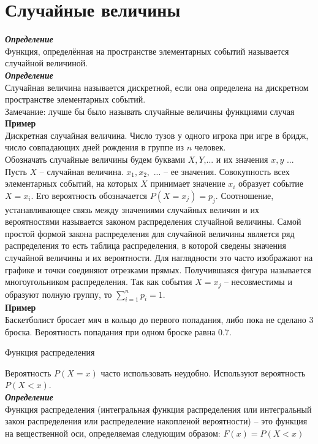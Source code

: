 \documentclass[russian, 12pt, fleqn]{article}
\begin{document}
\section{Случайные величины}
\textit{\textbf{Определение}}\\
Функция, определённая на пространстве элементарных событий называется случайной величиной.\\
\textit{\textbf{Определение}}\\
Случайная величина называется дискретной, если она определена на дискретном пространстве элементарных событий.\\
Замечание: лучше бы было называть случайные величины функциями случая\\
\textbf{Пример\ }\\Дискретная случайная величина. Число тузов у одного игрока при игре в бридж, число совпадающих дней рождения в группе из $n$ человек.\\
Обозначать случайные величины будем буквами $X, Y$,... и их значения $x, y$ ...
Пусть $X$ -- случайная величина. $x_1, x_2,$ ...  --  ее значения. Совокупность всех элементарных событий, на которых $X$ принимает значение $x_i$ образует событие $X=x_i$.
Его вероятность обозначается $P(X=x_j) = p_j$. Соотношение, устанавливающее связь между значениями случайных величин и их вероятностями называется законом распределения случайной величины. Самой простой формой закона распределения для случайной величины является ряд распределения то есть таблица распределения, в которой сведены значения случайной величины и их вероятности. Для наглядности это часто изображают на графике и точки соединяют отрезками прямых. Получившаяся фигура называется многоугольником распределения. Так как события $X=x_j$ -- несовместимы и образуют полную группу, то $\sum\limits_{i = 1}^{n}p_i = 1$.\\
\textbf{Пример\ }\\
Баскетболист бросает мяч в кольцо до первого попадания, либо пока не сделано 3 броска. Вероятность попадания при одном броске равна $0.7$.\\
\begin{center}
$\textbf{Функция распределения }$\\
\end{center}
Вероятность $P(X=x)$ часто использовать неудобно. Используют вероятность $P(X<x).$\\
\textit{\textbf{Определение}}\\
Функция распределения (интегральная функция распределения или интегральный закон распределения или распределение накопленой вероятности) -- это функция на вещественной оси, определяемая следующим образом: $F(x)=P(X<x)$\\
\end{document}
